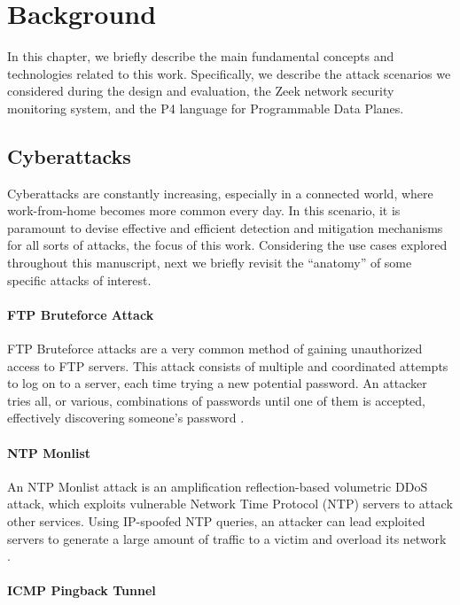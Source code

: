 \chapter{Background}
\label{cap:background}

In this chapter, we briefly describe the main fundamental concepts and technologies related to this work. Specifically, we describe the attack scenarios we considered during the design and evaluation, the Zeek network security monitoring system, and the P4 language for Programmable Data Planes.

\section{Cyberattacks}

Cyberattacks are constantly increasing, especially in a connected world, where work-from-home becomes more common every day. In this scenario, it is paramount to devise effective and efficient detection and mitigation mechanisms for all sorts of attacks, the focus of this work. Considering the use cases explored throughout this manuscript, next we briefly revisit the ``anatomy'' of some specific attacks of interest.

\subsubsection*{FTP Bruteforce Attack}
\label{sec:bg:ftp_bruteforce}

FTP Bruteforce attacks are a very common method of gaining unauthorized access to FTP servers. This attack consists of multiple and coordinated attempts to log on to a server, each time trying a new potential password. An attacker tries all, or various, combinations of passwords until one of them is accepted, effectively discovering someone's password \cite{FtpBruteforceAttack}.

\subsubsection*{NTP Monlist}
\label{sec:bg:ntp_monlist}

An NTP Monlist attack is an amplification reflection-based volumetric DDoS attack, which exploits vulnerable Network Time Protocol (NTP) servers to attack other services. Using IP-spoofed NTP queries, an attacker can lead exploited servers to generate a large amount of traffic to a victim and overload its network \cite{NtpMonlistAttack}.

\subsubsection*{ICMP Pingback Tunnel}
\label{sec:bg:pingback}

